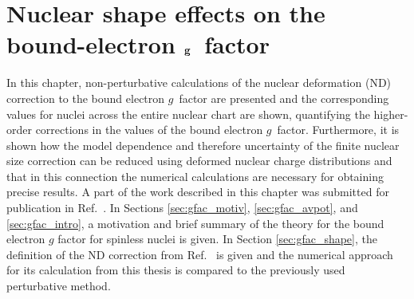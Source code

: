 \chapter{Nuclear shape effects on the bound-electron $\bf{g}$~factor}
\label{ch:nucl_def}

In this chapter, non-perturbative calculations of the nuclear deformation (ND) correction to the bound electron $g$~factor are presented and the corresponding values for nuclei across the entire nuclear chart are shown, quantifying the higher-order corrections in the values of the bound electron $g$~factor. Furthermore, it is shown how the model dependence and therefore uncertainty of the finite nuclear size correction can be reduced using deformed nuclear charge distributions and that in this connection the numerical calculations are necessary for obtaining precise results. A part of the work described in this chapter was submitted for publication in Ref.~\cite{michel_nuclDef}. In Sections \ref{sec:gfac_motiv}, \ref{sec:gfac_avpot}, and \ref{sec:gfac_intro}, a motivation and brief summary of the theory for the bound electron $g$ factor for spinless nuclei is given. In Section \ref{sec:gfac_shape}, the definition of the ND correction from Ref.~\cite{jacek2012} is given and the numerical approach for its calculation from this thesis is compared to the previously used perturbative method.

